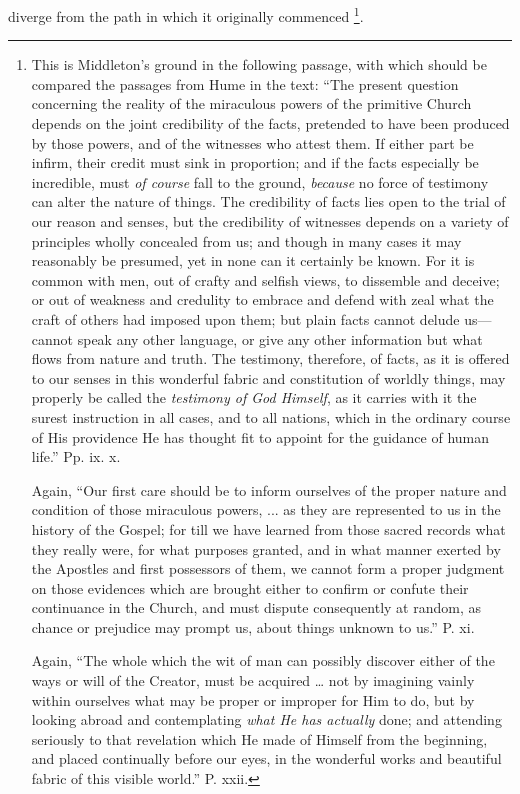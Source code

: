 diverge from the path in which it originally commenced \footnote{This is Middleton's ground in the following
passage, with which should be compared the passages from Hume in the
text: ``The present question concerning the reality of the miraculous
powers of the primitive Church depends on the joint credibility of the
facts, pretended to have been produced by those powers, and of the
witnesses who attest them. If either part be infirm, their credit must
sink in proportion; and if the facts especially be incredible, must \emph{of
course} fall to the ground, \emph{because} no force of testimony
can alter the nature of things. The credibility of facts lies open to
the trial of our reason and senses, but the credibility of witnesses
depends on a variety of principles wholly concealed from us; and
though in many cases it may reasonably be presumed, yet in none can it
certainly be known. For it is common with men, out of crafty and
selfish views, to dissemble and deceive; or out of weakness and
credulity to embrace and defend with zeal what the craft of others had
imposed upon them; but plain facts cannot delude us—cannot speak any
other language, or give any other information but what flows from
nature and truth. The testimony, therefore, of facts, as it is offered
to our senses in this wonderful fabric and constitution of worldly
things, may properly be called the \emph{testimony of God Himself}, as
it carries with it the surest instruction in all cases, and to all
nations, which in the ordinary course of His providence He has thought
fit to appoint for the guidance of human life.'' Pp. ix. x.

Again, ``Our first care should be to inform
ourselves of the proper nature and condition of those miraculous
powers, ... as they are represented to us in the history of the
Gospel; for till we have learned from those sacred records what they
really were, for what purposes granted, and in what manner exerted by
the Apostles and first possessors of them, we cannot form a proper
judgment on those evidences which are brought either to confirm or
confute their continuance in the Church, and must dispute consequently
at random, as chance or prejudice may prompt us, about things unknown
to us.'' P. xi.

Again, ``The whole which the wit of man can
possibly discover either of the ways or will of the Creator, must be
acquired … not by imagining vainly within ourselves what may be
proper or improper for Him to do, but by looking abroad and
contemplating \emph{what He has actually} done; and attending
seriously to that revelation which He made of Himself from the
beginning, and placed continually before our eyes, in the wonderful
works and beautiful fabric of this visible world.'' P. xxii.}.

